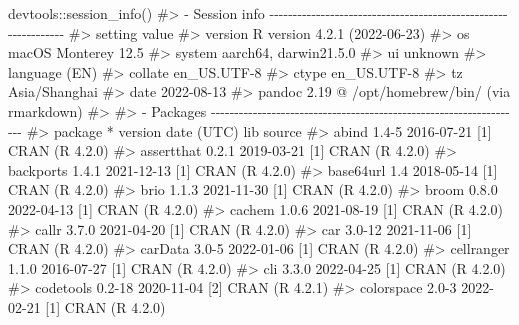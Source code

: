 \documentclass[
  11pt,
  letterpaper,
  DIV=11,
  numbers=noendperiod]{scrartcl}
\newenvironment{Shaded}{}{}
\newcommand{\CommentTok}[1]{\textcolor[rgb]{0.42,0.45,0.49}{#1}}
\newcommand{\FunctionTok}[1]{\textcolor[rgb]{0.44,0.26,0.76}{#1}}
\newcommand{\NormalTok}[1]{\textcolor[rgb]{0.14,0.16,0.18}{#1}}
\newcommand{\SpecialCharTok}[1]{\textcolor[rgb]{0.00,0.36,0.77}{#1}}
\begin{document}
\begin{Shaded}
\begin{Highlighting}[]
\NormalTok{devtools}\SpecialCharTok{::}\FunctionTok{session\_info}\NormalTok{()}
\CommentTok{\#\textgreater{} {-} Session info {-}{-}{-}{-}{-}{-}{-}{-}{-}{-}{-}{-}{-}{-}{-}{-}{-}{-}{-}{-}{-}{-}{-}{-}{-}{-}{-}{-}{-}{-}{-}{-}{-}{-}{-}{-}{-}{-}{-}{-}{-}{-}{-}{-}{-}{-}{-}{-}{-}{-}{-}{-}{-}{-}{-}{-}{-}{-}{-}{-}{-}{-}{-}}
\CommentTok{\#\textgreater{}  setting  value}
\CommentTok{\#\textgreater{}  version  R version 4.2.1 (2022{-}06{-}23)}
\CommentTok{\#\textgreater{}  os       macOS Monterey 12.5}
\CommentTok{\#\textgreater{}  system   aarch64, darwin21.5.0}
\CommentTok{\#\textgreater{}  ui       unknown}
\CommentTok{\#\textgreater{}  language (EN)}
\CommentTok{\#\textgreater{}  collate  en\_US.UTF{-}8}
\CommentTok{\#\textgreater{}  ctype    en\_US.UTF{-}8}
\CommentTok{\#\textgreater{}  tz       Asia/Shanghai}
\CommentTok{\#\textgreater{}  date     2022{-}08{-}13}
\CommentTok{\#\textgreater{}  pandoc   2.19 @ /opt/homebrew/bin/ (via rmarkdown)}
\CommentTok{\#\textgreater{} }
\CommentTok{\#\textgreater{} {-} Packages {-}{-}{-}{-}{-}{-}{-}{-}{-}{-}{-}{-}{-}{-}{-}{-}{-}{-}{-}{-}{-}{-}{-}{-}{-}{-}{-}{-}{-}{-}{-}{-}{-}{-}{-}{-}{-}{-}{-}{-}{-}{-}{-}{-}{-}{-}{-}{-}{-}{-}{-}{-}{-}{-}{-}{-}{-}{-}{-}{-}{-}{-}{-}{-}{-}{-}{-}}
\CommentTok{\#\textgreater{}  package     * version   date (UTC) lib source}
\CommentTok{\#\textgreater{}  abind         1.4{-}5     2016{-}07{-}21 [1] CRAN (R 4.2.0)}
\CommentTok{\#\textgreater{}  assertthat    0.2.1     2019{-}03{-}21 [1] CRAN (R 4.2.0)}
\CommentTok{\#\textgreater{}  backports     1.4.1     2021{-}12{-}13 [1] CRAN (R 4.2.0)}
\CommentTok{\#\textgreater{}  base64url     1.4       2018{-}05{-}14 [1] CRAN (R 4.2.0)}
\CommentTok{\#\textgreater{}  brio          1.1.3     2021{-}11{-}30 [1] CRAN (R 4.2.0)}
\CommentTok{\#\textgreater{}  broom         0.8.0     2022{-}04{-}13 [1] CRAN (R 4.2.0)}
\CommentTok{\#\textgreater{}  cachem        1.0.6     2021{-}08{-}19 [1] CRAN (R 4.2.0)}
\CommentTok{\#\textgreater{}  callr         3.7.0     2021{-}04{-}20 [1] CRAN (R 4.2.0)}
\CommentTok{\#\textgreater{}  car           3.0{-}12    2021{-}11{-}06 [1] CRAN (R 4.2.0)}
\CommentTok{\#\textgreater{}  carData       3.0{-}5     2022{-}01{-}06 [1] CRAN (R 4.2.0)}
\CommentTok{\#\textgreater{}  cellranger    1.1.0     2016{-}07{-}27 [1] CRAN (R 4.2.0)}
\CommentTok{\#\textgreater{}  cli           3.3.0     2022{-}04{-}25 [1] CRAN (R 4.2.0)}
\CommentTok{\#\textgreater{}  codetools     0.2{-}18    2020{-}11{-}04 [2] CRAN (R 4.2.1)}
\CommentTok{\#\textgreater{}  colorspace    2.0{-}3     2022{-}02{-}21 [1] CRAN (R 4.2.0)}

\end{Highlighting}
\end{Shaded}
\end{document}
